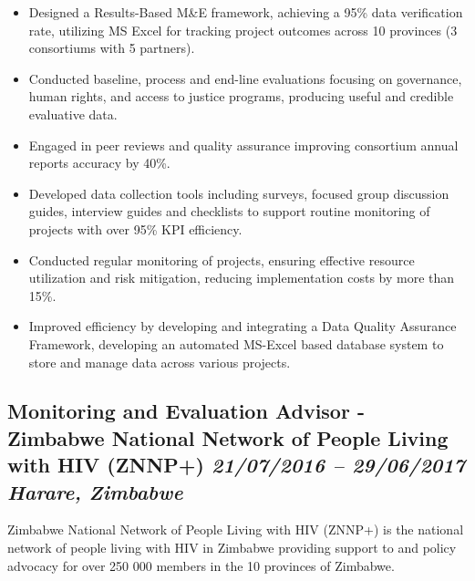 \documentclass[
  10pt,
]{article}
\providecommand{\tightlist}{%
  \setlength{\itemsep}{0pt}\setlength{\parskip}{0pt}}
\begin{document}
\begin{itemize}
\tightlist
\item
Designed a Results-Based M\&E framework, achieving a 95\% data verification rate, utilizing MS Excel for tracking project outcomes across 10 provinces (3 consortiums with 5 partners).
\item
Conducted baseline, process and end-line evaluations focusing on governance, human rights, and access to justice programs, producing useful and credible evaluative data.
\item
Engaged in peer reviews and quality assurance improving consortium annual reports accuracy by 40\%.
\item
Developed data collection tools including surveys, focused group discussion guides, interview guides and checklists to support routine monitoring of projects with over 95\% KPI efficiency.
\item
Conducted regular monitoring of projects, ensuring effective resource utilization and risk mitigation, reducing implementation costs by more than 15\%.
\item
Improved efficiency by developing and integrating a Data Quality Assurance Framework, developing an automated MS-Excel based database system to store and manage data across various projects.
\end{itemize}

\subsection{\texorpdfstring{Monitoring and Evaluation Advisor - Zimbabwe
National Network of People Living with HIV (ZNNP+) \emph{21/07/2016 --
29/06/2017} \textbar{} \emph{Harare, Zimbabwe}}{Monitoring and Evaluation Advisor - Zimbabwe National Network of People Living with HIV (ZNNP+) 21/07/2016 -- 29/06/2017 \textbar{} Harare, Zimbabwe}}\label{monitoring-and-evaluation-advisor---zimbabwe-national-network-of-people-living-with-hiv-znnp-21072016-29062017-harare-zimbabwe}

Zimbabwe National Network of People Living with HIV (ZNNP+) is the national network of people living with HIV in Zimbabwe providing support to and policy advocacy for over 250 000 members in the 10 provinces of Zimbabwe.
\end{document}

